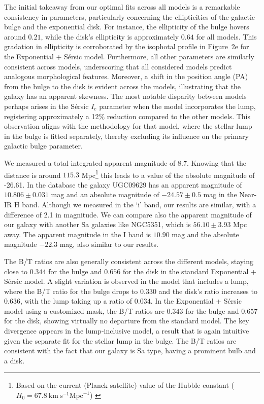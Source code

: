 The initial takeaway from our optimal fits across all models is a remarkable consistency in parameters, particularly concerning the ellipticities of the galactic bulge and the exponential disk. For instance, the ellipticity of the bulge hovers around \(0.21\), while the disk's ellipticity is approximately \(0.64\) for all models. This gradation in ellipticity is corroborated by the isophotal profile in Figure~2e for the Exponential + S\'{e}rsic model. Furthermore, all other parameters are similarly consistent across models, underscoring that all considered models predict analogous morphological features. Moreover, a shift in the position angle (PA) from the bulge to the disk is evident across the models, illustrating that the galaxy has an apparent skewness. The most notable disparity between models perhaps arises in the S\'{e}rsic \(I_{e}\) parameter when the model incorporates the lump, registering approximately a 12\% reduction compared to the other models. This observation aligns with the methodology for that model, where the stellar lump in the bulge is fitted separately, thereby excluding its influence on the primary galactic bulge parameter.


We measured a total integrated apparent magnitude of 8.7. Knowing that the distance is around $115.3$ Mpc\footnote{Based on the current (Planck satellite) value of the Hubble constant ($H_0=67.8 \ \text{km} \ \text{s}^{-1} \text{Mpc}^{-1}$) \citep{aghanim2020planck}}
this leads to a value of the absolute magnitude of -26.61. In the database \citep{ned} the galaxy UGC09629 has an apparent
magnitude of \(10.806 \pm 0.031\) mag and an absolute magnitude of \(-24.57 \pm 0.5\) mag in the Near-IR H band.
Although we measured in the `i' band, our results are similar, with a difference of 2.1 in magnitude. We can compare also the apparent magnitude of our galaxy with another Sa galaxies like NGC5351, which is \(56.10 \pm 3.93\) Mpc away. The apparent magnitude in the I band is \(10.90\) mag and the absolute magnitude \(-22.3\) mag, also similar to our results.

The B/T ratios are also generally consistent across the different models, staying close to \(0.344\) for the bulge and \(0.656\) for the disk in the standard Exponential + Sérsic model. A slight variation is observed in the model that includes a lump, where the B/T ratio for the bulge drops to \(0.330\) and the disk's ratio increases to \(0.636\), with the lump taking up a ratio of \(0.034\). In the Exponential + Sérsic model using a customized mask, the B/T ratios are \(0.343\) for the bulge and \(0.657\) for the disk, showing virtually no departure from the standard model. The key divergence appears in the lump-inclusive model, a result that is again intuitive given the separate fit for the stellar lump in the bulge. The B/T ratios are consistent with the fact that our galaxy is Sa type, having a prominent bulb and a disk.

